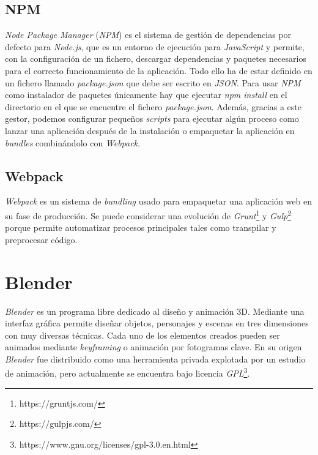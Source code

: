 \subsection{NPM}
\textit{Node Package Manager} (\textit{NPM}) es el sistema de gestión de dependencias por defecto para \textit{Node.js}, que es un entorno de ejecución para \textit{JavaScript} y permite, con la configuración de un fichero, descargar dependencias y paquetes necesarios para el correcto funcionamiento de la aplicación. Todo ello ha de estar definido en un fichero llamado \textit{package.json} que debe ser escrito en \textit{JSON}. Para usar \textit{NPM} como instalador de paquetes únicamente hay que ejecutar \textit{npm install} en el directorio en el que se encuentre el fichero \textit{package.json}. Además, gracias a este gestor, podemos configurar pequeños \textit{scripts} para ejecutar algún proceso como lanzar una aplicación después de la instalación o empaquetar la aplicación en \textit{bundles} combinándolo con \textit{Webpack}.

\subsection{Webpack}
\textit{Webpack} es un sistema de \textit{bundling} usado para empaquetar una aplicación web en su fase de producción. Se puede considerar una evolución de \textit{Grunt}\footnote{https://gruntjs.com/} y \textit{Gulp}\footnote{https://gulpjs.com/} porque permite automatizar procesos principales tales como transpilar y preprocesar código. 

\section{Blender}
\label{sec:blender}

\textit{Blender} es un programa libre dedicado al diseño y animación 3D. Mediante una interfaz gráfica permite diseñar objetos, personajes y escenas en tres dimensiones con muy diversas técnicas. Cada uno de los elementos creados pueden ser animados mediante \textit{keyframing} o animación por fotogramas clave. En su origen \textit{Blender} fue distribuido como una herramienta privada explotada por un estudio de animación, pero actualmente se encuentra bajo licencia \textit{GPL}\footnote{https://www.gnu.org/licenses/gpl-3.0.en.html}. 

